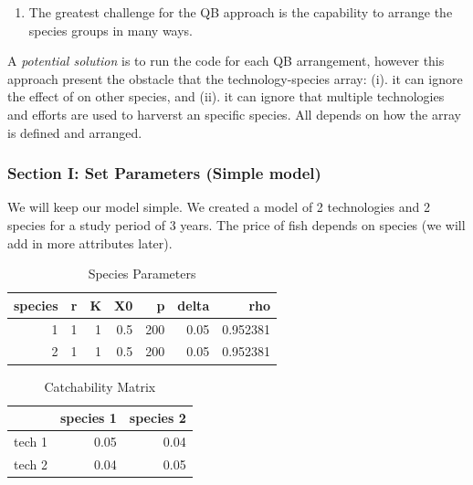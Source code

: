 \documentclass[
]{article}
\providecommand{\tightlist}{%
  \setlength{\itemsep}{0pt}\setlength{\parskip}{0pt}}
\begin{document}
\begin{enumerate}
\def\labelenumi{\arabic{enumi}.}
\setcounter{enumi}{3}
\tightlist
\item
  The greatest challenge for the QB approach is the capability to
  arrange the species groups in many ways.
\end{enumerate}

A \emph{potential solution} is to run the code for each QB arrangement,
however this approach present the obstacle that the technology-species
array: (i). it can ignore the effect of on other species, and (ii). it
can ignore that multiple technologies and efforts are used to harverst
an specific species. All depends on how the array is defined and
arranged.

\hypertarget{section-i-set-parameters-simple-model}{%
\subsubsection{Section I: Set Parameters (Simple
model)}\label{section-i-set-parameters-simple-model}}

We will keep our model simple. We created a model of 2 technologies and
2 species for a study period of 3 years. The price of fish depends on
species (we will add in more attributes later).

\begin{table}

\caption{\label{tab:unnamed-chunk-2}Species Parameters}
\centering
\begin{tabular}[t]{r|r|r|r|r|r|r}
\hline
species & r & K & X0 & p & delta & rho\\
\hline
1 & 1 & 1 & 0.5 & 200 & 0.05 & 0.952381\\
\hline
2 & 1 & 1 & 0.5 & 200 & 0.05 & 0.952381\\
\hline
\end{tabular}
\end{table}

\begin{table}

\caption{\label{tab:unnamed-chunk-4}Catchability Matrix}
\centering
\begin{tabular}[t]{l|r|r}
\hline
  & species 1 & species 2\\
\hline
tech 1 & 0.05 & 0.04\\
\hline
tech 2 & 0.04 & 0.05\\
\hline
\end{tabular}
\end{table}
\end{document}
